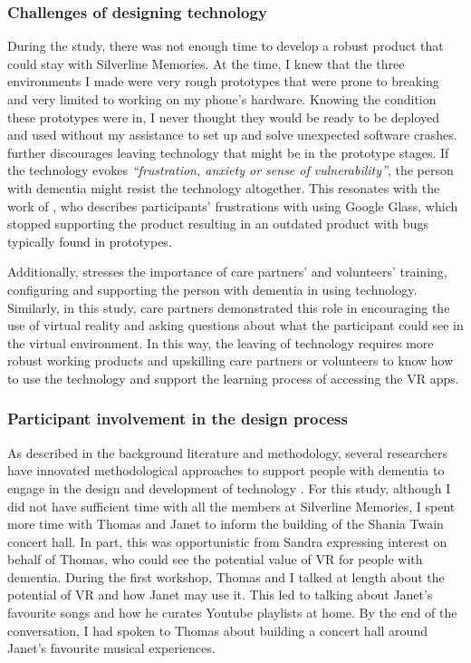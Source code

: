 \subsubsection{Challenges of designing technology}
\label{S1:Robustness}
During the study, there was not enough time to develop a robust product that could stay with Silverline Memories. At the time, I knew that the three environments I made were very rough prototypes that were prone to breaking and very limited to working on my phone's hardware. Knowing the condition these prototypes were in, I never thought they would be ready to be deployed and used without my assistance to set up and solve unexpected software crashes. \cite{hwang2020exploring} further discourages leaving technology that might be in the prototype stages. If the technology evokes \textit{``frustration, anxiety or sense of vulnerability''}, the person with dementia might resist the technology altogether. This resonates with the work of \cite{vines_our_2017}, who describes participants' frustrations with using Google Glass, which stopped supporting the product resulting in an outdated product with bugs typically found in prototypes. 

Additionally, \cite{hwang2020exploring} stresses the importance of care partners' and volunteers' training, configuring and supporting the person with dementia in using technology. Similarly, in this study, care partners demonstrated this role in encouraging the use of virtual reality and asking questions about what the participant could see in the virtual environment. In this way, the leaving of technology requires more robust working products and upskilling care partners or volunteers to know how to use the technology and support the learning process of accessing the VR apps. 

\subsubsection{Participant involvement in the design process}
\label{WhatExtentCo-design}
As described in the background literature and methodology, several researchers have innovated methodological approaches to support people with dementia to engage in the design and development of technology \citep{hendriks_challenges_2014, wallace_enabling_2012-1,lazar_critical_2017}. For this study, although I did not have sufficient time with all the members at Silverline Memories, I spent more time with Thomas and Janet to inform the building of the Shania Twain concert hall. In part, this was opportunistic from Sandra expressing interest on behalf of Thomas, who could see the potential value of VR for people with dementia. During the first workshop, Thomas and I talked at length about the potential of VR and how Janet may use it. This led to talking about Janet's favourite songs and how he curates Youtube playlists at home. By the end of the conversation, I had spoken to Thomas about building a concert hall around Janet's favourite musical experiences.

